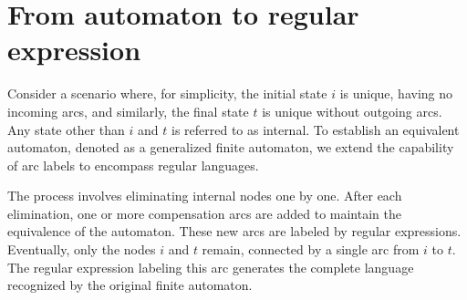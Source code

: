 \section{From automaton to regular expression}

Consider a scenario where, for simplicity, the initial state $i$ is unique, having no incoming arcs, and similarly, the final state $t$ is unique without outgoing arcs.
Any state other than $i$ and $t$ is referred to as internal.
To establish an equivalent automaton, denoted as a generalized finite automaton, we extend the capability of arc labels to encompass regular languages.

The process involves eliminating internal nodes one by one.
After each elimination, one or more compensation arcs are added to maintain the equivalence of the automaton. 
These new arcs are labeled by regular expressions.
Eventually, only the nodes $i$ and $t$ remain, connected by a single arc from $i$ to $t$. 
The regular expression labeling this arc generates the complete language recognized by the original finite automaton.

